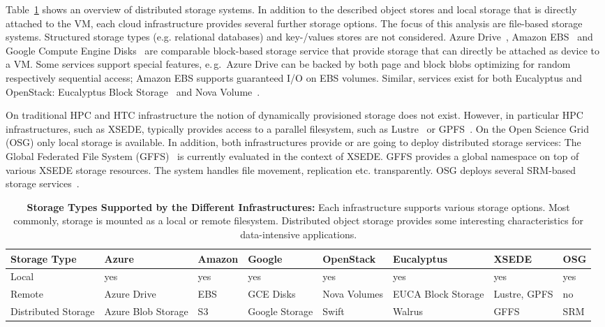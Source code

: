 \documentclass[times]{cpeauth}
\begin{document}
Table~\ref{tab:storage-systems} shows an overview of distributed storage
systems. In addition to the described object stores and local storage that is
directly attached to the VM, each cloud infrastructure provides several
further storage options. The focus of this analysis are file-based storage
systems. Structured storage types (e.g. relational databases) and key-/values
stores are not considered. Azure Drive~\cite{azure-drive}, Amazon
EBS~\cite{baron2010} and Google Compute Engine Disks~\cite{gce_disks} are
comparable block-based storage service that provide storage that can directly
be attached as device to a VM. Some services support special features, e.\,g.\
Azure Drive can be backed by both page and block blobs optimizing for random
respectively sequential access; Amazon EBS supports guaranteed I/O on EBS
volumes. Similar, services exist for both Eucalyptus and OpenStack: Eucalyptus
Block Storage~\cite{euca-block} and Nova Volume~\cite{nova-volume}.

On traditional HPC and HTC infrastructure the notion of dynamically
provisioned storage does not exist. However, in particular HPC
infrastructures, such as XSEDE, typically provides access to a parallel
filesystem, such as Lustre~\cite{lustre} or
GPFS~\cite{Schmuck:2002:GSF:1083323.1083349}. On the Open Science Grid (OSG)
only local storage is available. In addition, both infrastructures provide or
are going to deploy distributed storage services: The Global Federated File
System (GFFS)~\cite{gffs} is currently evaluated in the context of XSEDE. GFFS
provides a global namespace on top of various XSEDE storage resources. The
system handles file movement, replication etc. transparently. OSG deploys 
several SRM-based storage services~\cite{srm-ogf}.



\begin{table}[t]
\centering
\begin{tabular}{|p{1.7cm}|p{1.3cm}|p{1.3cm}|p{1.3cm}|p{1.4cm}|p{1.4cm}|p{1.3cm}|p{1.2cm}|}
	\hline
	\textbf{Storage Type} &\textbf{Azure} &\textbf{Amazon} &\textbf{Google} &\textbf{Open\-Stack} &\textbf{Euca\-lyptus} &\textbf{XSEDE}  &\textbf{OSG} \\
	\hline
	Local	&yes &yes &yes &yes &yes &yes &yes\\
	\hline
	Remote &Azure Drive &EBS &GCE Disks &Nova Volumes &EUCA Block Storage &Lustre, GPFS 
	&no\\
	\hline
	Distributed Storage &Azure Blob Storage &S3 &Google Storage &Swift & Walrus &GFFS
	 &SRM\\
	\hline	
\end{tabular}
\caption{\textbf{Storage Types Supported by the Different Infrastructures:} 
Each infrastructure supports various storage options. Most commonly, storage 
is mounted as a local or remote filesystem. Distributed object storage 
provides some interesting characteristics for data-intensive applications. 
\label{tab:storage-systems}}
\end{table}
\end{document}
